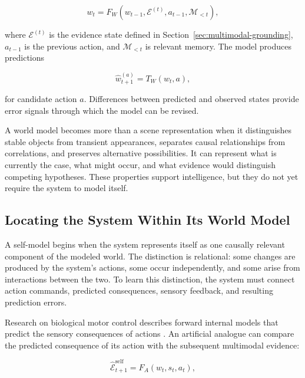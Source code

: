 \begin{equation}
w_t
=
F_W
\left(
w_{t-1},
\mathcal{E}^{(t)},
a_{t-1},
\mathcal{M}_{<t}
\right),
\label{eq:world-model-update}
\end{equation}

where $\mathcal{E}^{(t)}$ is the evidence state defined in Section~\ref{sec:multimodal-grounding}, $a_{t-1}$ is the previous action, and $\mathcal{M}_{<t}$ is relevant memory. The model produces predictions

\begin{equation}
\widehat{w}_{t+1}^{(a)}
=
T_W(w_t,a),
\label{eq:world-transition}
\end{equation}

for candidate action $a$. Differences between predicted and observed states provide error signals through which the model can be revised.

A world model becomes more than a scene representation when it distinguishes stable objects from transient appearances, separates causal relationships from correlations, and preserves alternative possibilities. It can represent what is currently the case, what might occur, and what evidence would distinguish competing hypotheses. These properties support intelligence, but they do not yet require the system to model itself.

\subsection{Locating the System Within Its World Model}
\label{subsec:self-world-distinction}

A self-model begins when the system represents itself as one causally relevant component of the modeled world. The distinction is relational: some changes are produced by the system's actions, some occur independently, and some arise from interactions between the two. To learn this distinction, the system must connect action commands, predicted consequences, sensory feedback, and resulting prediction errors.

Research on biological motor control describes forward internal models that predict the sensory consequences of actions \cite{wolpert1998internal}. An artificial analogue can compare the predicted consequence of its action with the subsequent multimodal evidence:

\begin{equation}
\widehat{\mathcal{E}}_{t+1}^{\mathrm{self}}
=
F_A(w_t,s_t,a_t),
\label{eq:self-action-prediction}
\end{equation}

